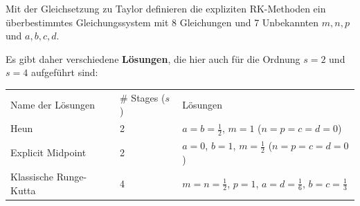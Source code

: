       Mit der Gleichsetzung zu Taylor definieren die expliziten RK-Methoden ein 
      überbestimmtes Gleichungssystem mit 8 Gleichungen und 7 Unbekannten $m,n,p$ und $a,b,c,d$.
      
      Es gibt daher verschiedene \textbf{Lösungen}, die hier auch für die Ordnung $s=2$ und $s=4$ aufgeführt sind:\\
      \begin{tabular}{lll}
        Name der Lösungen & \# Stages ($s$) & Lösungen\\
        Heun & 2 & $a=b=\frac12$, $m=1$ ($n=p=c=d=0$)\\
        Explicit Midpoint & 2 & $a=0$, $b=1$, $m=\frac12$ ($n=p=c=d=0$)\\
        Klassische Runge-Kutta & 4 & $m=n=\frac12$, $p=1$, $a=d=\frac16$, $b=c=\frac13$
      \end{tabular}
    
